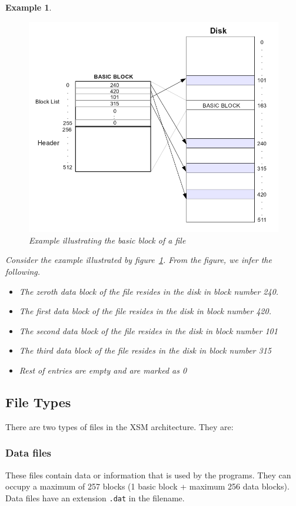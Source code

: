 \documentclass[11pt]{article}
\newtheorem{example}{Example}[section]
\begin{document}
\begin{example}
	\begin{figure}[h!]
	\centering
	\includegraphics[scale=0.50]{pics/basic_block_example}
	\caption{Example illustrating the basic block of a file}
	\label{basic block example}
	\end{figure}

	Consider the example illustrated by figure~\ref{basic block example}.
	From the figure, we infer the following. 
	\begin{itemize}
		\item  The zeroth data block of the file resides in the disk in block number 240. 
		\item  The first data block of the file resides in the disk in block number 420.
		\item  The second data block of the file resides in the disk in block number 101 
		\item  The third data block of the file resides in the disk in block number 315
		\item Rest of entries are empty and are marked as 0
	\end{itemize}
\end{example}

\subsection{File Types} 
There are two types of files in the XSM architecture. They are:
\subsubsection{Data files} These files contain data or information that is used by the programs. They can occupy a maximum of 257 blocks (1 basic block + maximum 256 data blocks). Data files have an extension \texttt{.dat} in the filename.
	
\end{document}
